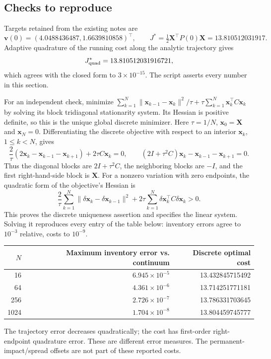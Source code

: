 \documentclass[11pt,a4paper]{article}
\begin{document}
\subsection*{Checks to reproduce}

Targets retained from the existing notes are
\[
 \mathbf v(0)=(4.0488436487,1.6639810858)^\top,\qquad
 J^*=\tfrac12\mathbf X^\top P(0)\mathbf X=13.810512031917.
\]
Adaptive quadrature of the running cost along the analytic trajectory gives
\[
 J^*_{\rm quad}=13.810512031916721,
\]
which agrees with the closed form to $3\times10^{-15}$. The script 
asserts every number in this section.

For an independent check, minimize
$\sum_{k=1}^N\|\mathbf x_{k-1}-\mathbf x_k\|^2/\tau
+\tau\sum_{k=1}^N\mathbf x_k^\top C\mathbf x_k$ by solving its block
tridiagonal stationarity system. Its Hessian is positive definite, so this
is the unique global discrete minimizer.
Here $\tau=1/N$, $\mathbf x_0=\mathbf X$ and $\mathbf x_N=0$.
Differentiating the discrete objective with respect to an interior
$\mathbf x_k$, $1\le k<N$, gives
\[
 \frac{2}{\tau}(2\mathbf x_k-\mathbf x_{k-1}-\mathbf x_{k+1})
 +2\tau C\mathbf x_k=0,
 \qquad
 (2I+\tau^2 C)\mathbf x_k-\mathbf x_{k-1}-\mathbf x_{k+1}=0.
\]
Thus the diagonal blocks are $2I+\tau^2 C$, the neighboring blocks
are $-I$, and the first right-hand-side block is $\mathbf X$.
For a nonzero variation with zero endpoints, the quadratic form of the
objective's Hessian is
\[
 \frac{2}{\tau}\sum_{k=1}^N
 \|\delta\mathbf x_k-\delta\mathbf x_{k-1}\|^2
 +2\tau\sum_{k=1}^N\delta\mathbf x_k^\top C\delta\mathbf x_k>0.
\]
This proves the discrete uniqueness assertion and specifies the
linear system. Solving it reproduces every entry of the table below:
inventory errors agree to $10^{-3}$ relative, costs to $10^{-9}$.
\begin{center}
\begin{tabular}{@{}rrr@{}}
\toprule
$N$ & Maximum inventory error vs. continuum & Discrete optimal cost \\
\midrule
16 & $6.945\times10^{-5}$ & 13.432845715492 \\
64 & $4.361\times10^{-6}$ & 13.714251771181 \\
256 & $2.726\times10^{-7}$ & 13.786331703645 \\
1024 & $1.704\times10^{-8}$ & 13.804459745777 \\
\bottomrule
\end{tabular}
\end{center}
The trajectory error decreases quadratically; the cost has first-order
right-endpoint quadrature error. These are different error measures.
The permanent-impact/spread offsets are not part of these reported costs.
\end{document}

